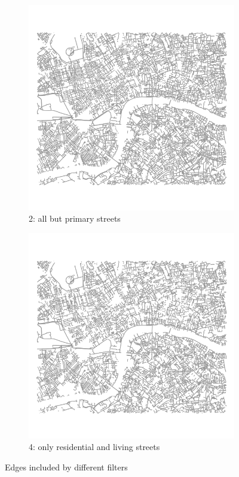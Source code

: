 \documentclass[11pt]{article} %
\begin{document}
\begin{figure}
\centering
\begin{subfigure}{.5\textwidth}
  \centering
  \includegraphics[width=1\linewidth]{bbox_bike_2_filter_cropped}
  \caption{2: all but primary streets}
  \label{fig:sub1}
\end{subfigure}
\begin{subfigure}{.5\textwidth}
  \centering
  \includegraphics[width=1\linewidth]{bbox_bike_4_filter_cropped}
  \caption{4: only residential and living streets}
  \label{fig:sub2}
\end{subfigure}
\caption{Edges included by different filters}
\label{fig:test}
\end{figure}
\end{document}
